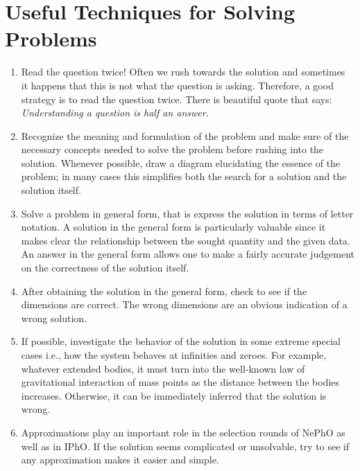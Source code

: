\chapter*{Useful Techniques for Solving Problems}

\begin{enumerate}

    \item Read the question twice! Often we rush towards the solution and sometimes it happens that this is not what the question is asking. Therefore, a good strategy is to read the question twice. There is beautiful quote that says: \textit{Understanding a question is half an answer.}    
    
    \item Recognize the meaning and formulation of the problem and make sure of the necessary concepts needed to solve the problem before rushing into the solution. Whenever possible, draw a diagram elucidating the essence of the problem; in many cases this simplifies both the search for a solution and the solution itself.  
    
    \item Solve a problem in general form, that is express the solution in terms of letter notation. A solution in the general form is particularly valuable since it makes clear the relationship between the sought quantity and the given data. An answer in the general form allows one to make a fairly accurate judgement on the correctness of the solution itself.   

   \item After obtaining the solution in the general form, check to see if the dimensions are correct. The wrong dimensions are an obvious indication of a wrong solution. 
   
   \item If possible, investigate the behavior of the solution in some extreme special cases i.e., how the system behaves at infinities and zeroes. For example, whatever extended bodies, it must turn into the well-known law of gravitational interaction of mass points as the distance between the bodies increases. Otherwise, it can be immediately inferred that the solution is wrong.
   
   \item Approximations play an important role in the selection rounds of NePhO as well as in IPhO. If the solution seems complicated or unsolvable, try to see if any approximation makes it easier and simple.   
\end{enumerate}
